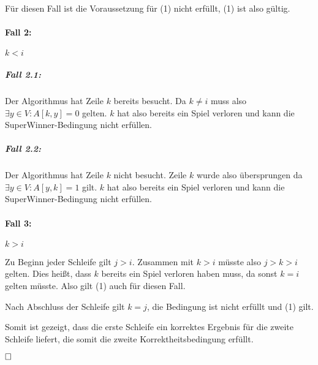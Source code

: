 \documentclass[12pt]{scrartcl}%
\theoremstyle{nonumberplain}
\begin{document}
Für diesen Fall ist die Voraussetzung für (1) nicht erfüllt, (1) ist also gültig.

\paragraph{Fall 2:} $k < i$

\subparagraph{Fall 2.1:}

Der Algorithmus hat Zeile $k$ bereits besucht. Da $k \not= i$ muss also $\exists y \in V: A[k,y] = 0$ gelten. $k$ hat also bereits ein Spiel verloren und kann die SuperWinner-Bedingung nicht erfüllen.

\subparagraph{Fall 2.2:}

Der Algorithmus hat Zeile $k$ nicht besucht. Zeile $k$ wurde also übersprungen da $\exists y \in V: A[y,k] = 1$ gilt. $k$ hat also bereits ein Spiel verloren und kann die SuperWinner-Bedingung nicht erfüllen.

\paragraph{Fall 3:} $k > i$

Zu Beginn jeder Schleife gilt $j > i$. Zusammen mit $k > i$ müsste also $j > k > i$ gelten. Dies heißt, dass $k$ bereits ein Spiel verloren haben muss, da sonst $k = i$ gelten müsste. Also gilt (1) auch für diesen Fall.

Nach Abschluss der Schleife gilt $k = j$, die Bedingung ist nicht erfüllt und (1) gilt.

Somit ist gezeigt, dass die erste Schleife ein korrektes Ergebnis für die zweite Schleife liefert, die somit die zweite Korrektheitsbedingung erfüllt. 

$\hfill\square$
\end{document}
